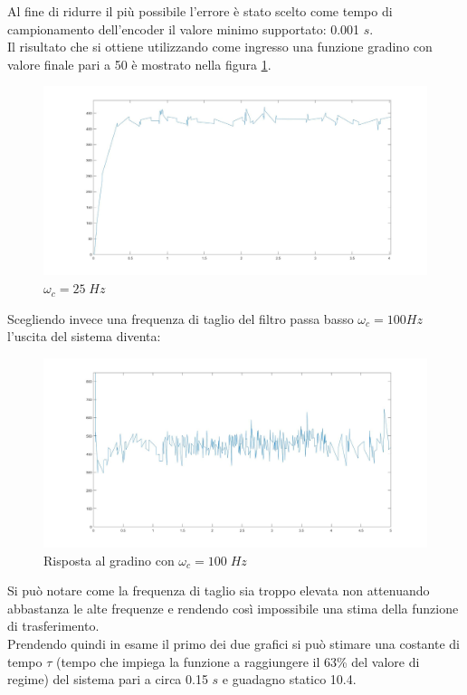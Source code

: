 Al fine di ridurre il più possibile l'errore è stato scelto come tempo di campionamento dell'encoder il valore minimo supportato: 0.001 $s$.\\
Il risultato che si ottiene utilizzando come ingresso una funzione gradino con valore finale pari a 50 è mostrato nella figura \ref{motore50StepCamp1000}.
\begin{figure}[ht]
	\centering
	\includegraphics[width=\textwidth]{motore50StepCamp1000.jpg}
	\caption{$\omega_c=25\;Hz$}
	\label{motore50StepCamp1000}
\end{figure}
Scegliendo invece una frequenza di taglio del filtro passa basso $\omega_c = 100Hz$ l'uscita del sistema diventa:
\begin{figure}[ht]
	\centering
	\includegraphics[width=\textwidth]{motore50StepCamp1000Polo100.jpg}
	\caption{Risposta al gradino con $\omega_c=100\;Hz$ }
	\label{motore50StepCamp1000Polo100}
\end{figure}
Si può notare come la frequenza di taglio sia troppo elevata non attenuando abbastanza le alte frequenze e rendendo così impossibile una stima della funzione di trasferimento.\\
Prendendo quindi in esame il primo dei due grafici si può stimare una costante di tempo $\tau$ (tempo che impiega la funzione a raggiungere il 63\% del valore di regime) del sistema pari a circa 0.15 $s$ e guadagno statico 10.4.\\
